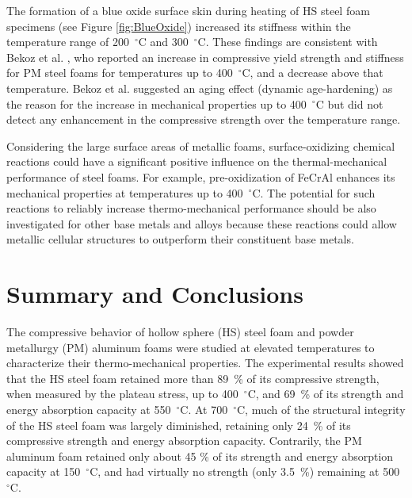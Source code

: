 \documentclass[review]{elsarticle}
\begin{document}
The formation of a blue oxide surface skin during heating of HS steel foam specimens (see Figure \ref{fig:BlueOxide}) increased its stiffness within the temperature range of 200~$^\circ\mathrm{C}$ and 300~$^\circ\mathrm{C}$. These findings are consistent with Bekoz et al. \cite{BekozOktay2014}, who reported an increase in compressive yield strength and stiffness for PM steel foams for temperatures up to 400~$^\circ\mathrm{C}$, and a decrease above that temperature. Bekoz et al. \cite{BekozOktay2014} suggested an aging effect (dynamic age-hardening) as the reason for the increase in mechanical properties up to 400~$^\circ\mathrm{C}$ but did not detect any enhancement in the compressive strength over the temperature range.

Considering the large surface areas of metallic foams, surface-oxidizing chemical reactions could have a significant positive influence on the thermal-mechanical performance of steel foams. For example, pre-oxidization of FeCrAl enhances its mechanical properties at temperatures up to 400~$^\circ\mathrm{C}$. The potential for such reactions to reliably increase thermo-mechanical performance should be also investigated for other base metals and alloys because these reactions could allow metallic cellular structures to outperform their constituent base metals.

\section{Summary and Conclusions}

The compressive behavior of hollow sphere (HS) steel foam and powder metallurgy (PM) aluminum foams were studied at elevated temperatures to characterize their thermo-mechanical properties. The experimental results showed that the HS steel foam retained more than 89~\% of its compressive strength, when measured by the plateau stress, up to 400~$^\circ\mathrm{C}$, and 69~\% of its strength and energy absorption capacity at 550~$^\circ\mathrm{C}$. At 700~$^\circ\mathrm{C}$, much of the structural integrity of the HS steel foam was largely diminished, retaining only 24~\% of its compressive strength and energy absorption capacity. Contrarily, the PM aluminum foam retained only about 45 \% of its strength and energy absorption capacity at 150~$^\circ\mathrm{C}$, and had virtually no strength (only 3.5~\%) remaining at 500~$^\circ\mathrm{C}$.
\end{document}
